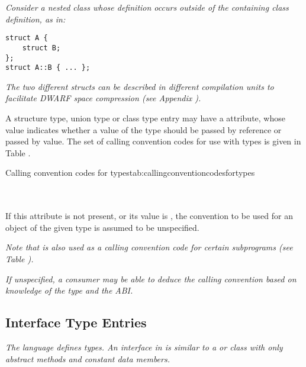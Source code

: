 \textit{Consider a nested class whose 
definition occurs outside of the containing class definition, as in:}

\begin{lstlisting}[numbers=none]
struct A {
    struct B;
};
struct A::B { ... };
\end{lstlisting}

\textit{The two different structs can be described in 
different compilation units to 
facilitate DWARF space compression 
(see Appendix ).}

A structure type, union type or class type entry may have a
\DWATcallingconvention{} attribute,
whose value indicates whether a value of the type should be passed by reference 
or passed by value. The set of calling convention codes for use with types 
\hypertarget{chap:DWATcallingconventionfortypes}{}
is given in Table .

\begin{simplenametable}[2.2in]{Calling convention codes for types}{tab:callingconventioncodesfortypes}
\DWCCnormalTARG             \\
\DWCCpassbyvalueTARG        \\
\DWCCpassbyreferenceTARG    \\
\end{simplenametable}

If this attribute is not present, or its value is
\DWCCnormalNAME, the convention to be used for an object of the
given type is assumed to be unspecified.

\textit{Note that \DWCCnormalNAME{} is also used as a calling convention 
code for certain subprograms 
(see Table ).}

\textit{If unspecified, a consumer may be able to deduce the calling
convention based on knowledge of the type and the ABI.}


\subsection{Interface Type Entries}
\label{chap:interfacetypeentries}

\textit{The  language defines  types. 
An interface
in  is similar to a  or 
 class with only abstract
methods and constant data members.}

